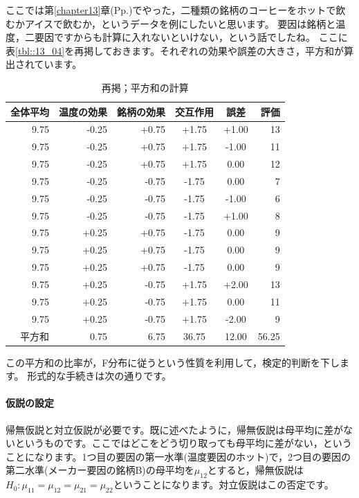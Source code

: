 \documentclass{ltjbook}
\begin{document}
ここでは第\ref{chapter13}章(Pp.\pageref{Between2way})でやった，二種類の銘柄のコーヒーをホットで飲むかアイスで飲むか，というデータを例にしたいと思います。
要因は銘柄と温度，二要因ですからも計算に入れないといけない，という話でしたね。
ここに表\ref{tbl::13_04}を再掲しておきます。それぞれの効果や誤差の大きさ，平方和が算出されています。
\begin{table}[ht]
  \centering
  \caption{再掲；平方和の計算} 
  \begin{tabular}{rrrccr}
    \hline
  全体平均 & 温度の効果 & 銘柄の効果 & 交互作用 & 誤差 & 評価 \\ 
    \hline
  9.75 & -0.25 & +0.75 & +1.75 & +1.00 & 13 \\ 
  9.75 & -0.25 & +0.75 & +1.75 & -1.00 & 11 \\ 
  9.75 & -0.25 & +0.75 & +1.75 &  0.00 & 12 \\ \hline
  9.75 & -0.25 & -0.75 & -1.75 &  0.00 & 7 \\ 
  9.75 & -0.25 & -0.75 & -1.75 & -1.00 & 6\\ 
  9.75 & -0.25 & -0.75 & -1.75 & +1.00 & 8 \\ \hline
  9.75 & +0.25 & +0.75 & -1.75 &  0.00 & 9 \\ 
  9.75 & +0.25 & +0.75 & -1.75 &  0.00 & 9 \\ 
  9.75 & +0.25 & +0.75 & -1.75 &  0.00 & 9 \\ \hline
  9.75 & +0.25 & -0.75 & +1.75 & +2.00 & 13 \\ 
  9.75 & +0.25 & -0.75 & +1.75 &  0.00 & 11 \\ 
  9.75 & +0.25 & -0.75 & +1.75 & -2.00 & 9 \\ 
     \hline\hline
平方和 & 0.75 & 6.75 & 36.75 & 12.00 &  56.25\\\hline
  \end{tabular}
  \label{tbl::21_06}
\end{table}

この平方和の比率が，F分布に従うという性質を利用して，検定的判断を下します。
形式的な手続きは次の通りです。
\paragraph{仮説の設定}帰無仮説と対立仮説が必要です。既に述べたように，帰無仮説は母平均に差がないというものです。ここではどこをどう切り取っても母平均に差がない，ということになります。1つ目の要因の第一水準(温度要因のホット)で，2つ目の要因の第二水準(メーカー要因の銘柄B)の母平均を$\mu_{12}$とすると，帰無仮説は$H_0:\mu_{11}=\mu_{12}=\mu_{21}=\mu_{22}$ということになります。対立仮説はこの否定です。
\end{document}
